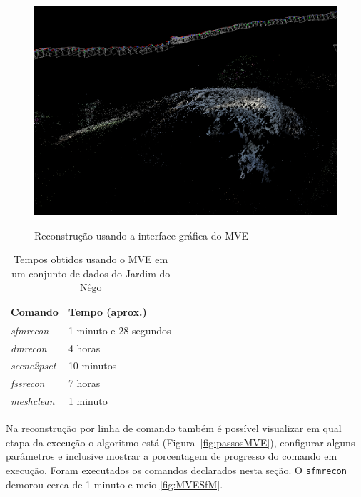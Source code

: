 \begin{figure}[!h]
	\centering
	\caption{Reconstrução usando a interface gráfica do MVE}
	\includegraphics[width=\linewidth]{figs/umvedense.png}
	\label{fig:UMVEdense}
\end{figure} 

\begin{table}[!h]
\centering
\caption{Tempos obtidos usando o MVE em um conjunto de dados do Jardim do Nêgo}
\label{tab:mveSapo}
\begin{tabular}{|l|l|}
\hline
Comando            & Tempo (aprox.)    \\ \hline
\emph{sfmrecon}  & 1 minuto e 28 segundos     \\ \hline
\emph{dmrecon}   & 4 horas \\ \hline
\emph{scene2pset} & 10 minutos    \\ \hline
\emph{fssrecon}  & 7 horas \\ \hline
\emph{meshclean} & 1 minuto     \\ \hline
\end{tabular}
\end{table}

Na reconstrução por linha de comando também é possível visualizar em qual etapa
da execução o algoritmo está (Figura~\ref{fig:passosMVE}), configurar alguns
parâmetros e inclusive mostrar a porcentagem de progresso do comando em
execução. Foram executados os comandos declarados nesta seção.  O
\texttt{sfmrecon} demorou cerca de 1 minuto e meio \ref{fig:MVESfM}. 

